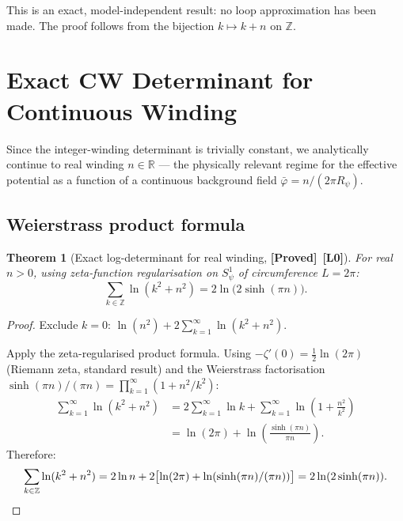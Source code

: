 \documentclass[12pt,a4paper]{article}
\newtheorem{theorem}{Theorem}[section]
\theoremstyle{definition}
\theoremstyle{remark}
\newcommand{\RR}{\mathbb{R}}
\newcommand{\ZZ}{\mathbb{Z}}
\newcommand{\PROVED}{\textbf{[Proved]}}
\newcommand{\Lzero}{\textbf{[L0]}}
\begin{document}
This is an exact, model-independent result: no loop approximation has been
made.  The proof follows from the bijection $k \mapsto k + n$ on $\ZZ$.

\section{Exact CW Determinant for Continuous Winding}
\label{sec:cw:continuous}

Since the integer-winding determinant is trivially constant, we analytically
continue to real winding $n \in \RR$ — the physically relevant regime for
the effective potential as a function of a continuous background field
$\bar{\varphi} = n/(2\pi R_\psi)$.

\subsection{Weierstrass product formula}

\begin{theorem}[Exact log-determinant for real winding, \PROVED\ \Lzero]
\label{thm:cw:exact}
For real $n > 0$, using zeta-function regularisation on $S^1_\psi$
of circumference $L = 2\pi$:
\begin{equation}
  \sum_{k \in \ZZ} \ln(k^2 + n^2)
  = 2\ln\bigl(2\sinh(\pi n)\bigr).
  \label{eq:cw:weierstrass}
\end{equation}
\end{theorem}

\begin{proof}
Exclude $k = 0$: $\ln(n^2) + 2\sum_{k=1}^\infty \ln(k^2 + n^2)$.

Apply the zeta-regularised product formula.  Using $-\zeta'(0) = \tfrac{1}{2}\ln(2\pi)$
(Riemann zeta, standard result) and the Weierstrass factorisation
$\sinh(\pi n)/(\pi n) = \prod_{k=1}^\infty (1 + n^2/k^2)$:
\begin{align*}
  \sum_{k=1}^\infty \ln(k^2 + n^2)
  &= 2\sum_{k=1}^\infty \ln k + \sum_{k=1}^\infty \ln\!\left(1 + \tfrac{n^2}{k^2}\right) \\
  &= \ln(2\pi) + \ln\!\left(\frac{\sinh(\pi n)}{\pi n}\right).
\end{align*}
Therefore:
\[
  \sum_{k\in\ZZ} \ln(k^2+n^2)
  = 2\ln n + 2\bigl[\ln(2\pi) + \ln(\sinh(\pi n)/(\pi n))\bigr]
  = 2\ln(2\sinh(\pi n)). \qedhere
\]
\end{proof}
\end{document}
